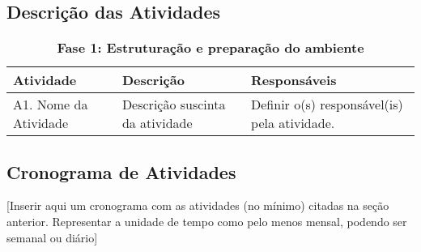 \subsection{Descrição das Atividades} %
\label{sub:descri_o_das_atividades}

\begin{table}[htbp]
\centering
\caption{\textbf{Fase 1: Estruturação e preparação do ambiente}}
\begin{tabular}{|p{2.5cm}|p{10cm}|p{2.5cm}|}
\hline
\textbf{Atividade} & \textbf{Descrição} & \textbf{Responsáveis} \\ \hline
A1. Nome da Atividade & Descrição suscinta da atividade & Definir o(s) responsável(is) pela atividade. \\ \hline
\end{tabular}
\label{}
\end{table}


\subsection{Cronograma de Atividades} %
\label{sub:cronograma_de_atividades}

[Inserir aqui um cronograma com as atividades (no mínimo) citadas na seção anterior. Representar a unidade de tempo como pelo menos mensal, podendo ser semanal ou diário]